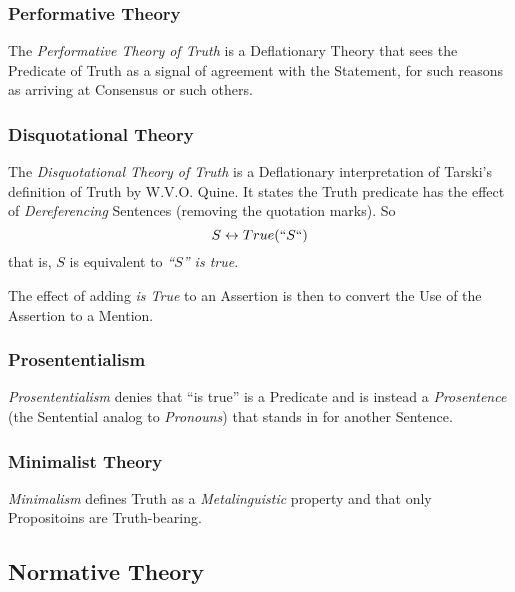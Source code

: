 \subsubsection{Performative Theory}\label{sec:performative_theory}

The \emph{Performative Theory of Truth} is a Deflationary Theory that
sees the Predicate of Truth as a signal of agreement with the
Statement, for such reasons as arriving at Consensus or such others.



\subsubsection{Disquotational Theory}\label{sec:disquotational_theory}

The \emph{Disquotational Theory of Truth} is a Deflationary
interpretation of Tarski's definition of Truth by W.V.O. Quine. It
states the Truth predicate has the effect of \emph{Dereferencing}
Sentences (removing the quotation marks). So
\[
    S \leftrightarrow True(``S``)
\]
that is, $S$ is equivalent to \emph{``$S$'' is true}.

The effect of adding \emph{is True} to an Assertion is then to convert
the Use of the Assertion to a Mention.



\subsubsection{Prosententialism}\label{sec:prosententialism}

\emph{Prosententialism} denies that ``is true'' is a Predicate and is
instead a \emph{Prosentence} (the Sentential analog to
\emph{Pronouns}) that stands in for another Sentence.



\subsubsection{Minimalist Theory}\label{sec:minimalist_theory}

\emph{Minimalism} defines Truth as a \emph{Metalinguistic} property
and that only Propositoins are Truth-bearing.



\subsection{Normative Theory}\label{sec:normative_theory}


